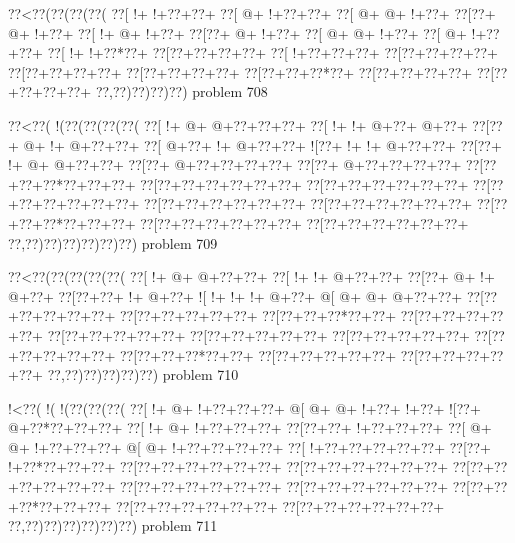 \vbox{\vbox{\goo
\0??<\0??(\0??(\0??(\0??(
\0??[\- !+\- !+\0??+\0??+
\0??[\- @+\- !+\0??+\0??+
\0??[\- @+\- @+\- !+\0??+
\0??[\0??+\- @+\- !+\0??+
\0??[\- !+\- @+\- !+\0??+
\0??[\0??+\- @+\- !+\0??+
\0??[\- @+\- @+\- !+\0??+
\0??[\- @+\- !+\0??+\0??+
\0??[\- !+\- !+\0??*\0??+
\0??[\0??+\0??+\0??+\0??+
\0??[\- !+\0??+\0??+\0??+
\0??[\0??+\0??+\0??+\0??+
\0??[\0??+\0??+\0??+\0??+
\0??[\0??+\0??+\0??+\0??+
\0??[\0??+\0??+\0??*\0??+
\0??[\0??+\0??+\0??+\0??+
\0??[\0??+\0??+\0??+\0??+
\0??,\0??)\0??)\0??)\0??)
}
\hfil problem 708\hfil\break
}

\vbox{\vbox{\goo
\0??<\0??(\- !(\0??(\0??(\0??(\0??(
\0??[\- !+\- @+\- @+\0??+\0??+\0??+
\0??[\- !+\- !+\- @+\0??+\- @+\0??+
\0??[\0??+\- @+\- !+\- @+\0??+\0??+
\0??[\- @+\0??+\- !+\- @+\0??+\0??+
\- ![\0??+\- !+\- !+\- @+\0??+\0??+
\0??[\0??+\- !+\- @+\- @+\0??+\0??+
\0??[\0??+\- @+\0??+\0??+\0??+\0??+
\0??[\0??+\- @+\0??+\0??+\0??+\0??+
\0??[\0??+\0??+\0??*\0??+\0??+\0??+
\0??[\0??+\0??+\0??+\0??+\0??+\0??+
\0??[\0??+\0??+\0??+\0??+\0??+\0??+
\0??[\0??+\0??+\0??+\0??+\0??+\0??+
\0??[\0??+\0??+\0??+\0??+\0??+\0??+
\0??[\0??+\0??+\0??+\0??+\0??+\0??+
\0??[\0??+\0??+\0??*\0??+\0??+\0??+
\0??[\0??+\0??+\0??+\0??+\0??+\0??+
\0??[\0??+\0??+\0??+\0??+\0??+\0??+
\0??,\0??)\0??)\0??)\0??)\0??)\0??)
}
\hfil problem 709\hfil\break
}

\vbox{\vbox{\goo
\0??<\0??(\0??(\0??(\0??(\0??(
\0??[\- !+\- @+\- @+\0??+\0??+
\0??[\- !+\- !+\- @+\0??+\0??+
\0??[\0??+\- @+\- !+\- @+\0??+
\0??[\0??+\0??+\- !+\- @+\0??+
\- ![\- !+\- !+\- !+\- @+\0??+
\- @[\- @+\- @+\- @+\0??+\0??+
\0??[\0??+\0??+\0??+\0??+\0??+
\0??[\0??+\0??+\0??+\0??+\0??+
\0??[\0??+\0??+\0??*\0??+\0??+
\0??[\0??+\0??+\0??+\0??+\0??+
\0??[\0??+\0??+\0??+\0??+\0??+
\0??[\0??+\0??+\0??+\0??+\0??+
\0??[\0??+\0??+\0??+\0??+\0??+
\0??[\0??+\0??+\0??+\0??+\0??+
\0??[\0??+\0??+\0??*\0??+\0??+
\0??[\0??+\0??+\0??+\0??+\0??+
\0??[\0??+\0??+\0??+\0??+\0??+
\0??,\0??)\0??)\0??)\0??)\0??)
}
\hfil problem 710\hfil\break
}

\vbox{\vbox{\goo
\- !<\0??(\- !(\- !(\0??(\0??(\0??(
\0??[\- !+\- @+\- !+\0??+\0??+\0??+
\- @[\- @+\- @+\- !+\0??+\- !+\0??+
\- ![\0??+\- @+\0??*\0??+\0??+\0??+
\0??[\- !+\- @+\- !+\0??+\0??+\0??+
\0??[\0??+\0??+\- !+\0??+\0??+\0??+
\0??[\- @+\- @+\- !+\0??+\0??+\0??+
\- @[\- @+\- !+\0??+\0??+\0??+\0??+
\0??[\- !+\0??+\0??+\0??+\0??+\0??+
\0??[\0??+\- !+\0??*\0??+\0??+\0??+
\0??[\0??+\0??+\0??+\0??+\0??+\0??+
\0??[\0??+\0??+\0??+\0??+\0??+\0??+
\0??[\0??+\0??+\0??+\0??+\0??+\0??+
\0??[\0??+\0??+\0??+\0??+\0??+\0??+
\0??[\0??+\0??+\0??+\0??+\0??+\0??+
\0??[\0??+\0??+\0??*\0??+\0??+\0??+
\0??[\0??+\0??+\0??+\0??+\0??+\0??+
\0??[\0??+\0??+\0??+\0??+\0??+\0??+
\0??,\0??)\0??)\0??)\0??)\0??)\0??)
}
\hfil problem 711\hfil\break
}

